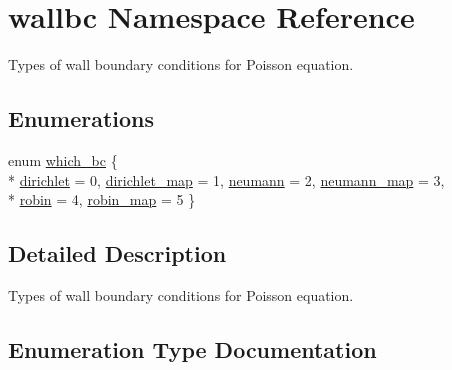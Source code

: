 \hypertarget{namespacewallbc}{}\section{wallbc Namespace Reference}
\label{namespacewallbc}


Types of wall boundary conditions for Poisson equation.  


\subsection*{Enumerations}
\begin{DoxyCompactItemize}
\item 
enum \hyperlink{namespacewallbc_ac79598e478fbcdc07082173cc75d4d99}{which\+\_\+bc} \{ \\*
\hyperlink{namespacewallbc_ac79598e478fbcdc07082173cc75d4d99aa5f52de5b35082184d1cfee9917603dc}{dirichlet} = 0, 
\hyperlink{namespacewallbc_ac79598e478fbcdc07082173cc75d4d99ae706408b9a4d47f84d5706774f355651}{dirichlet\+\_\+map} = 1, 
\hyperlink{namespacewallbc_ac79598e478fbcdc07082173cc75d4d99af96af98ad1a4a3c3dc14811cdee51acc}{neumann} = 2, 
\hyperlink{namespacewallbc_ac79598e478fbcdc07082173cc75d4d99a3e2effbc735fbd334c608be3c0add026}{neumann\+\_\+map} = 3, 
\\*
\hyperlink{namespacewallbc_ac79598e478fbcdc07082173cc75d4d99a53a49fbbe63fe8473b1fda4f5d349338}{robin} = 4, 
\hyperlink{namespacewallbc_ac79598e478fbcdc07082173cc75d4d99acd7d4e427fef897bb2df4242bb2fb472}{robin\+\_\+map} = 5
 \}
\end{DoxyCompactItemize}


\subsection{Detailed Description}
Types of wall boundary conditions for Poisson equation. 

\subsection{Enumeration Type Documentation}
